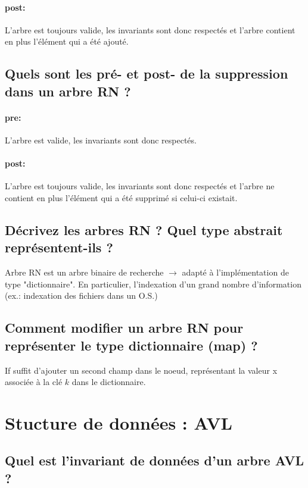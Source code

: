 \documentclass[11pt]{article}
\begin{document}
\paragraph{post:} L'arbre est toujours valide, les invariants sont donc respectés et l'arbre contient en plus l'élément qui a été ajouté. 

\subsection{Quels sont les pré- et post- de la suppression dans un arbre RN ?}

\paragraph{pre:} L'arbre est valide, les invariants sont donc respectés.
\paragraph{post:} L'arbre est toujours valide, les invariants sont donc respectés et l'arbre ne contient en plus l'élément qui a été supprimé si celui-ci existait.

\subsection{Décrivez les arbres RN ? Quel type abstrait représentent-ils ?}

Arbre RN est un arbre binaire de recherche $\rightarrow$ adapté à l'implémentation de type "dictionnaire". En particulier, l'indexation d'un grand nombre d'information (ex.: indexation des fichiers dans un O.S.)

\subsection{Comment modifier un arbre RN pour représenter le type dictionnaire (map) ?}

If suffit d'ajouter un second champ dans le noeud, représentant la valeur x associée à la clé $k$ dans le dictionnaire.

\section{Stucture de données : AVL}

\subsection{Quel est l'invariant de données d'un arbre AVL ?}
\end{document}
